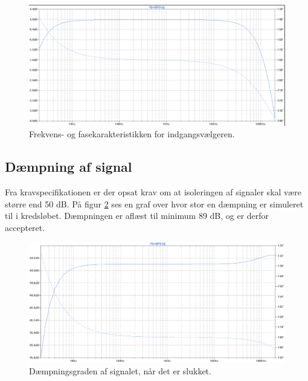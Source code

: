 \begin{figure}[h]
\centering
\includegraphics[scale=0.3]{teknisk/indgangsvaelger/simulering/frekvenskarakteristik.png}
\caption{Frekvens- og fasekarakteristikken for indgangsvælgeren.}
\label{indgangsvaelger_frekvenskarakteristik}
\end{figure}

\subsection*{Dæmpning af signal}
Fra kravspecifikationen er der opsat krav om at isoleringen af signaler skal være større end 50 dB. På figur \ref{indgangsvaelger_daempniing} ses en graf over hvor stor en dæmpning er simuleret til i kredsløbet. Dæmpningen er aflæst til minimum 89 dB, og er derfor accepteret.
\begin{figure}[h]
\centering
\includegraphics[scale=0.3]{teknisk/indgangsvaelger/simulering/daempning_af_signal.png}
\caption{Dæmpningsgraden af signalet, når det er slukket.}
\label{indgangsvaelger_daempniing}
\end{figure}

